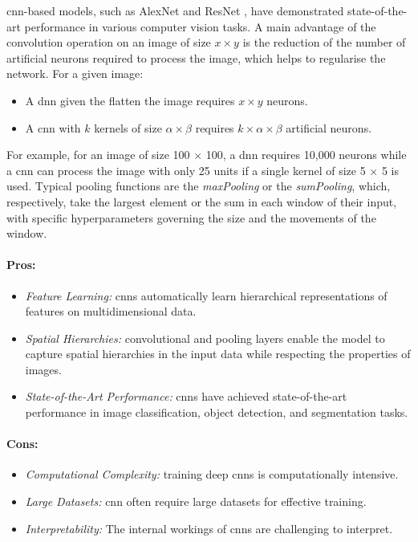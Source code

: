 \gls{cnn}-based models, such as AlexNet \cite{NIPS2012_c399862d} and ResNet \cite{resNetPaper}, have demonstrated state-of-the-art performance in various computer vision tasks. A main advantage of the convolution operation on an image of size $x \times y$ is the reduction of the number of artificial neurons required to process the image, which helps to regularise the network. For a given image:
\begin{itemize}
    \item A \gls{dnn} given the flatten the image requires $x \times y$ neurons. 
    \item A \gls{cnn} with $k$ kernels of size $\alpha \times \beta$ requires $k \times \alpha \times \beta$ artificial neurons. 
\end{itemize}
For example, for an image of size 100 $\times$ 100, a \gls{dnn} requires 10,000 neurons while a \gls{cnn} can process the image with only 25 units if a single kernel of size 5 $\times$ 5 is used. Typical pooling functions are the \textit{maxPooling} or the \textit{sumPooling}, which, respectively, take the largest element or the sum in each window of their input, with specific hyperparameters governing the size and the movements of the window.

\paragraph{Pros:}
\begin{itemize}
    \item \textit{Feature Learning:} \glspl{cnn} automatically learn hierarchical representations of features on multidimensional data.
    \item \textit{Spatial Hierarchies:} convolutional and pooling layers enable the model to capture spatial hierarchies in the input data while respecting the properties of images. 
    \item \textit{State-of-the-Art Performance:} \glspl{cnn} have achieved state-of-the-art performance in image classification, object detection, and segmentation tasks.
\end{itemize}

\paragraph{Cons:}
\begin{itemize}
    \item \textit{Computational Complexity:} training deep \glspl{cnn} is computationally intensive.
    \item \textit{Large Datasets:} \gls{cnn} often require large datasets for effective training.
    \item \textit{Interpretability:} The internal workings of \glspl{cnn} are challenging to interpret.
\end{itemize}

